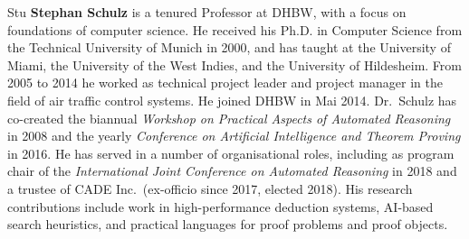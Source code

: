 \begin{sitedescription}{Stu}
\textbf{Stephan Schulz} is a tenured Professor at DHBW, with a focus
on foundations of computer science. He received his Ph.D. in Computer
Science from the Technical University of Munich in 2000, and has
taught at the University of Miami, the University of the West Indies,
and the University of Hildesheim. From 2005 to 2014 he worked as
technical project leader and project manager in the field of air
traffic control systems. He joined DHBW in Mai 2014. Dr.\ Schulz has
co-created the biannual \emph{Workshop on Practical Aspects of
  Automated Reasoning} in 2008 and the yearly \emph{Conference on
  Artificial Intelligence and Theorem Proving} in 2016. He has served
in a number of organisational roles, including as program chair of the
\emph{International Joint Conference on Automated Reasoning} in 2018
and a trustee of CADE Inc.\ (ex-officio since 2017, elected 2018). His
research contributions include work in high-performance deduction
systems, AI-based search heuristics, and practical languages for proof
problems and proof objects.

\end{sitedescription}

